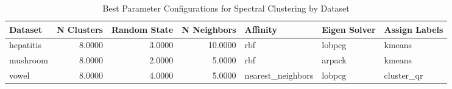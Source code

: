 \begin{table*}[ht!]
\caption{Best Parameter Configurations for Spectral Clustering by Dataset}
\label{tab:best_configs_spectral_clustering_config}
\begin{tabular}{lrrrlll}
Dataset & N Clusters & Random State & N Neighbors & Affinity & Eigen Solver & Assign Labels \\\midrule

hepatitis & 8.0000 & 3.0000 & 10.0000 & rbf & lobpcg & kmeans \\
mushroom & 8.0000 & 2.0000 & 5.0000 & rbf & arpack & kmeans \\
vowel & 8.0000 & 4.0000 & 5.0000 & nearest\_neighbors & lobpcg & cluster\_qr \\
\end{tabular}
\end{table*}
